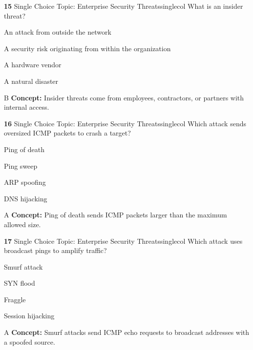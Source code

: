 \documentclass[10pt,a4paper]{article}
\begin{document}
\begin{qcard}{\color{white}\textbf{15} \hfill \small Single Choice \textbar{} Topic: Enterprise Security Threats}{singlecol}
What is an insider threat?

\begin{qoptions}
\item An attack from outside the network
\item A security risk originating from within the organization
\item A hardware vendor
\item A natural disaster
\end{qoptions}
\begin{explainbox}{B}
\textbf{Concept:} Insider threats come from employees, contractors, or partners with internal access.
\end{explainbox}
\end{qcard}

\begin{qcard}{\color{white}\textbf{16} \hfill \small Single Choice \textbar{} Topic: Enterprise Security Threats}{singlecol}
Which attack sends oversized ICMP packets to crash a target?

\begin{qoptions}
\item Ping of death
\item Ping sweep
\item ARP spoofing
\item DNS hijacking
\end{qoptions}
\begin{explainbox}{A}
\textbf{Concept:} Ping of death sends ICMP packets larger than the maximum allowed size.
\end{explainbox}
\end{qcard}

\begin{qcard}{\color{white}\textbf{17} \hfill \small Single Choice \textbar{} Topic: Enterprise Security Threats}{singlecol}
Which attack uses broadcast pings to amplify traffic?

\begin{qoptions}
\item Smurf attack
\item SYN flood
\item Fraggle
\item Session hijacking
\end{qoptions}
\begin{explainbox}{A}
\textbf{Concept:} Smurf attacks send ICMP echo requests to broadcast addresses with a spoofed source.
\end{explainbox}
\end{qcard}
\end{document}
